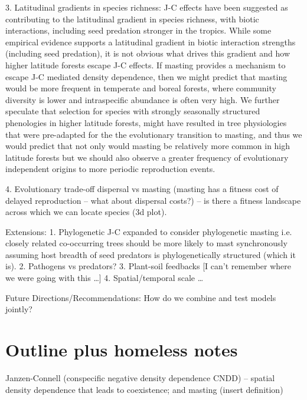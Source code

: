 \documentclass[11pt]{article}
\begin{document}
3. Latitudinal gradients in species richness: J-C effects have been suggested as contributing to the latitudinal gradient in species richness, with biotic interactions, including seed predation stronger in the tropics. While some empirical evidence supports a latitudinal gradient in biotic interaction strengths (including seed predation), it is not obvious what drives this gradient and how higher latitude forests escape J-C effects. If masting provides a mechanism to escape J-C mediated density dependence, then we might predict that masting would be more frequent in temperate and boreal forests, where community diversity is lower and intraspecific abundance is often very high. We further speculate that selection for species with strongly seasonally structured phenologies in higher latitude forests, might have resulted in tree physiologies that were pre-adapted for the the evolutionary transition to masting, and thus we would predict that not only would masting be relatively more common in high latitude forests but we should also observe a greater frequency of evolutionary independent origins to more periodic reproduction events.

4. Evolutionary trade-off dispersal vs masting (masting has a fitness cost of delayed reproduction – what about dispersal costs?) – is there a fitness landscape across which we can locate species (3d plot).

Extensions:
1. Phylogenetic J-C expanded to consider phylogenetic masting i.e. closely related co-occurring trees should be more likely to mast synchronously assuming host breadth of seed predators is phylogenetically structured (which it is).
2. Pathogens vs predators?
3. Plant-soil feedbacks [I can’t remember where we were going with this …]
4. Spatial/temporal scale …

Future Directions/Recommendations:
How do we combine and test models jointly?


\section{Outline plus homeless notes}

Janzen-Connell (conspecific negative density dependence CNDD) -- spatial density dependence that leads to coexistence; and masting (insert definition)
\end{document}

